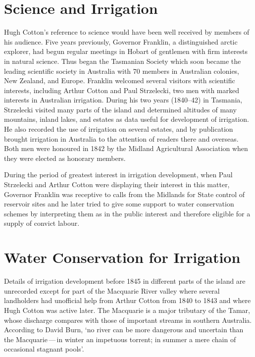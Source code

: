 \section*{Science and Irrigation}

Hugh Cotton's reference to science would have been well received by
members of his audience.  Five years previously, Governor
Franklin, a distinguished arctic explorer,
had begun regular meetings in Hobart of gentlemen with firm interests
in natural science.  Thus began the Tasmanian Society which soon
became the leading scientific society in Australia with 70 members in
Australian colonies, New Zealand, and Europe.  Franklin welcomed
several visitors with scientific interests, including Arthur Cotton
and Paul Strzelecki, two men with marked
interests in Australian irrigation.  During his two years (1840--42)
in Tasmania, Strzelecki visited many parts of the island and
determined altitudes of many mountains, inland lakes, and estates as
data useful for development of irrigation.  He also recorded the use
of irrigation on several estates, and by publication brought
irrigation in Australia to the attention of readers there and
overseas.  Both men were honoured in 1842 by the Midland Agricultural
Association when they were elected as honorary members.

During the period of greatest interest in irrigation development, when
Paul Strzelecki and Arthur Cotton were displaying their interest in
this matter, Governor Franklin was receptive to calls from the
Midlands for State control of reservoir sites and he later tried to
give some support to water conservation schemes by interpreting them
as in the public interest and therefore eligible for a supply of
convict labour.

\section*{Water Conservation for Irrigation}

Details of irrigation development before 1845 in different parts of
the island are unrecorded except for part of the Macquarie River
valley where several landholders had unofficial help from Arthur
Cotton from 1840 to 1843 and where Hugh Cotton was active later.  The
Macquarie is a major tributary of the Tamar, whose
discharge compares with those of important streams in southern
Australia. According to David Burn, `no river can be more dangerous
and uncertain than the Macquarie\,---\,in winter an impetuous torrent;
in summer a mere chain of occasional stagnant
pools'.

